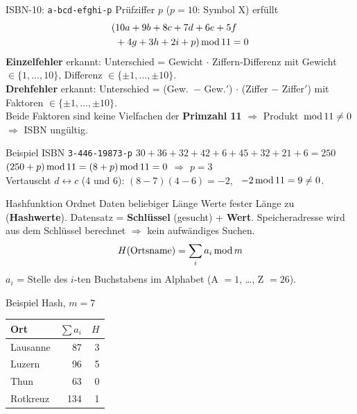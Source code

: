 \documentclass[a4paper, fontsize=7pt]{scrartcl}
\newcommand{\Mod}{\mskip3mu\mathrm{mod}\mskip3mu}
\begin{document}
\begin{mainbox}{ISBN-10: \texttt{a-bcd-efghi-p}}
Prüfziffer $p$ ($p = 10$: Symbol X) erfüllt
\begin{align*}
(&10a + 9b + 8c + 7d + 6e + 5f\\
 &+ 4g + 3h + 2i + p) \Mod 11 = 0
\end{align*}
\textbf{Einzelfehler} erkannt: Unterschied = Gewicht $\cdot$ Ziffern-Differenz
mit Gewicht $\in \{1, \ldots, 10\}$, Differenz $\in \{\pm 1, \ldots, \pm 10\}$.\\
\textbf{Drehfehler} erkannt: Unterschied = (Gew.\ $-$ Gew.$'$) $\cdot$
(Ziffer $-$ Ziffer$'$) mit Faktoren $\in \{\pm 1, \ldots, \pm 10\}$.\\
Beide Faktoren sind keine Vielfachen der \textbf{Primzahl 11}
$\Rightarrow$ Produkt $\Mod 11 \neq 0$ $\Rightarrow$ ISBN ungültig.
\end{mainbox}

\begin{subbox}{Beispiel ISBN \texttt{3-446-19873-p}}
$30 + 36 + 32 + 42 + 6 + 45 + 32 + 21 + 6 = 250$\\
$(250 + p) \Mod 11 = (8 + p) \Mod 11 = 0$ $\Rightarrow$ $\boxed{p = 3}$\\
Vertauscht $d \leftrightarrow c$ (4 und 6):
$(8 - 7)(4 - 6) = -2$, \ $-2 \Mod 11 = 9 \neq 0$.
\end{subbox}

\begin{mainbox}{Hashfunktion}
Ordnet Daten beliebiger Länge Werte fester Länge zu (\textbf{Hashwerte}).
Datensatz = \textbf{Schlüssel} (gesucht) + \textbf{Wert}. Speicheradresse wird
aus dem Schlüssel berechnet $\Rightarrow$ kein aufwändiges Suchen.
$$H(\text{Ortsname}) = \sum_i a_i \Mod m$$
$a_i$ = Stelle des $i$-ten Buchstabens im Alphabet (A $= 1$, \ldots, Z $= 26$).
\end{mainbox}

\begin{subbox}{Beispiel Hash, $m = 7$}
\begin{center}
\begin{tabular}{@{}lrr@{}}
Ort & $\sum a_i$ & $H$ \\ \hline
Lausanne & 87 & 3 \\
Luzern & 96 & 5 \\
Thun & 63 & 0 \\
Rotkreuz & 134 & 1
\end{tabular}
\end{center}
\end{subbox}
\end{document}
